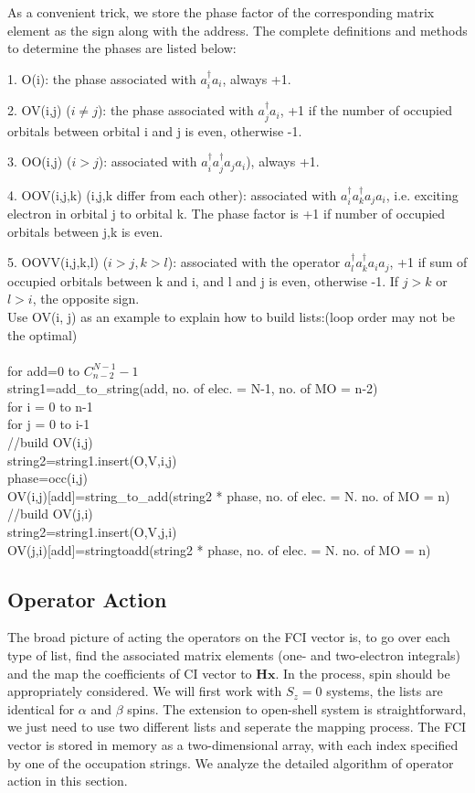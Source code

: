 \documentclass[twocolumn]{article}
\begin{document}
As a convenient trick, we store the phase factor of the corresponding matrix element as the sign along with the address.
The complete definitions and methods to determine the phases are listed below:

1. O(i): the phase associated with $a_i^{\dagger}a_i$, always +1.

2. OV(i,j) ($i\neq j$): the phase associated with $a_j^{\dagger}a_i$, +1 if the number of occupied orbitals between orbital i and j is even, otherwise -1.

3. OO(i,j) ($i>j$): associated with $a_i^{\dagger}a_j^{\dagger}a_ja_i$), always +1.

4. OOV(i,j,k) (i,j,k differ from each other): associated with $a_i^{\dagger}a_k^{\dagger}a_ja_i$, i.e. exciting electron in orbital j to orbital k. The phase factor is +1 if number of occupied orbitals between j,k is even.

5. OOVV(i,j,k,l) ($i>j,k>l$): associated with the operator $a_l^{\dagger}a_k^{\dagger}a_ia_j$, +1 if sum of occupied orbitals between k and i, and l and j is even, otherwise -1. If $j>k$ or $l>i$, the opposite sign.
\\

Use OV(i, j) as an example to explain how to build lists:(loop order may not be the optimal)\\
\\
for add=0 to $C_{n-2}^{N-1}-1$\\
\indent string1=add\_to\_string(add, no. of elec. = N-1, no. of MO = n-2)\\
\indent for i = 0 to n-1\\
\indent\indent for j = 0 to i-1\\
\indent\indent\indent //build OV(i,j)\\
\indent\indent\indent string2=string1.insert(O,V,i,j)\\
\indent\indent\indent phase=occ(i,j)\\
\indent\indent\indent OV(i,j)[add]=string\_to\_add(string2 * phase, no. of elec. = N. no. of MO = n)\\
\indent\indent\indent //build OV(j,i)\\
\indent\indent\indent string2=string1.insert(O,V,j,i)\\
\indent\indent\indent OV(j,i)[add]=stringtoadd(string2 * phase, no. of elec. = N. no. of MO = n)

\subsection{Operator Action}
The broad picture of acting the operators on the FCI vector is, to go over each type of list, 
find the associated matrix elements (one- and two-electron integrals) and the map the coefficients of CI vector to $\mathbf{Hx}$. 
In the process, spin should be appropriately considered.  We will first work with $S_z=0$ systems, the lists are identical for $\alpha$ and $\beta$ spins. The extension to open-shell system is straightforward, we just need to use two different lists and seperate the mapping process.
The FCI vector is stored in memory as a two-dimensional array, with each index specified by one of the occupation strings. 
We analyze the detailed algorithm of operator action in this section.
\end{document}
